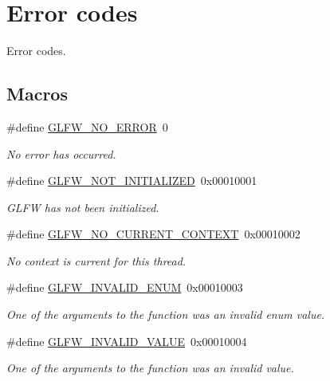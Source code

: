 \hypertarget{group__errors}{}\section{Error codes}
\label{group__errors}


Error codes.  


\subsection*{Macros}
\begin{DoxyCompactItemize}
\item 
\#define \mbox{\hyperlink{group__errors_gafa30deee5db4d69c4c93d116ed87dbf4}{G\+L\+F\+W\+\_\+\+N\+O\+\_\+\+E\+R\+R\+OR}}~0
\begin{DoxyCompactList}\small\item\em No error has occurred. \end{DoxyCompactList}\item 
\#define \mbox{\hyperlink{group__errors_ga2374ee02c177f12e1fa76ff3ed15e14a}{G\+L\+F\+W\+\_\+\+N\+O\+T\+\_\+\+I\+N\+I\+T\+I\+A\+L\+I\+Z\+ED}}~0x00010001
\begin{DoxyCompactList}\small\item\em G\+L\+FW has not been initialized. \end{DoxyCompactList}\item 
\#define \mbox{\hyperlink{group__errors_gaa8290386e9528ccb9e42a3a4e16fc0d0}{G\+L\+F\+W\+\_\+\+N\+O\+\_\+\+C\+U\+R\+R\+E\+N\+T\+\_\+\+C\+O\+N\+T\+E\+XT}}~0x00010002
\begin{DoxyCompactList}\small\item\em No context is current for this thread. \end{DoxyCompactList}\item 
\#define \mbox{\hyperlink{group__errors_ga76f6bb9c4eea73db675f096b404593ce}{G\+L\+F\+W\+\_\+\+I\+N\+V\+A\+L\+I\+D\+\_\+\+E\+N\+UM}}~0x00010003
\begin{DoxyCompactList}\small\item\em One of the arguments to the function was an invalid enum value. \end{DoxyCompactList}\item 
\#define \mbox{\hyperlink{group__errors_gaaf2ef9aa8202c2b82ac2d921e554c687}{G\+L\+F\+W\+\_\+\+I\+N\+V\+A\+L\+I\+D\+\_\+\+V\+A\+L\+UE}}~0x00010004
\begin{DoxyCompactList}\small\item\em One of the arguments to the function was an invalid value. \end{DoxyCompactList}\item 

\end{DoxyCompactItemize}

